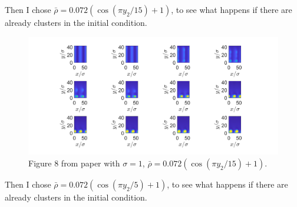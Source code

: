 \documentclass[11pt, a4paper]{article}
\theoremstyle{definition}
\begin{document}
Then I chose $\bar \rho = 0.072 (\cos(\pi y_2/15) +1 )$, to see what happens if there are already clusters in the initial condition.


\begin{figure}[h]
	\centering
	\includegraphics[scale=0.4]{Sed3.png}
	\caption{Figure 8 from paper with $\sigma = 1$, $\bar \rho = 0.072 (\cos(\pi y_2/15) +1 )$.} 
	\label{F1b}
\end{figure}

Then I chose $\bar \rho = 0.072 (\cos(\pi y_2/5) +1 )$, to see what happens if there are already clusters in the initial condition.
\end{document}
